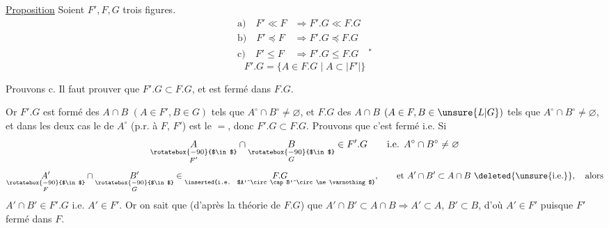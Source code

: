 \uline{Proposition} Soient $F',F,G$ trois figures.
\[
\begin{aligned}
 \text{a)}\quad F'\ll F&\Longrightarrow F'.G\ll F.G\\
 \text{b)}\quad F'\preceq F&\Longrightarrow F'.G\preceq F.G\\
 \text{c)}\quad F'\leq F&\Longrightarrow F'.G\leq F.G\quad{}^{*}
\end{aligned}
\]
\[
 F'.G=\{A\in F.G\mid A\subset |F'|\}
\]

Prouvons c. Il faut prouver que  $F'.G\subset F.G$, et est fermé dans $F.G$.

 Or $F'.G$ est formé des $A\cap B$ $(A\in F',B\in G)$ tels que $A^\circ\cap B^\circ\ne\varnothing$, et $F.G$ des $A\cap B$ $(A\in F,B\in \unsure{L|G})$ tels que $A^\circ\cap B^\circ\ne\varnothing$, et dans les deux cas le  de $A^\circ$ (p.r. à $F$,  $F'$) est le $=$, donc $F'.G\subset F.G$. Prouvons que c'est fermé i.e.
Si 
\[
 \underset{\substack{\rotatebox{-90}{$\in$}\\ F'}}{A}\cap
 \underset{\substack{\rotatebox{-90}{$\in$}\\ G}}{B}\in F'.G\qquad
 \text{i.e. } A^\circ\cap B^\circ\ne\varnothing
\]
\[
 \underset{\substack{\rotatebox{-90}{$\in$}\\ F}}{A'}\cap
 \underset{\substack{\rotatebox{-90}{$\in$}\\ G}}{B'}\in\underset{\text{\inserted{i.e. $A'^\circ\cap B'^\circ\ne\varnothing$}}}{F.G},\qquad
 \text{et } A'\cap B'\subset A\cap B\ \deleted{\unsure{\text{i.e.}}},\quad\text{alors}
\]
$A'\cap B'\in F'.G$ i.e. $A'\in F'$. Or on sait que (d'après la théorie de $F.G$) que $A'\cap B'\subset A\cap B\Longrightarrow A'\subset A$, $B'\subset B$, d'où $A'\in F'$ puisque $F'$ fermé dans $F$.

